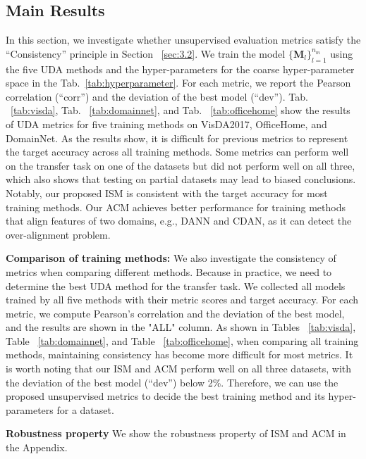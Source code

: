 \documentclass{article} %
\begin{document}
\subsection{Main Results}
\label{sec:4.2}

In this section, we investigate whether unsupervised evaluation metrics satisfy the ``Consistency'' principle in Section ~\ref{sec:3.2}. We train the model $\{\boldsymbol{M}_l\}_{l=1}^{n_m}$ using the five UDA methods and the hyper-parameters for the coarse hyper-parameter space in the Tab.~\ref{tab:hyperparameter}. For each metric, we report the Pearson correlation (``corr'') and the deviation of the best model (``dev'').
Tab. ~\ref{tab:visda}, Tab. ~\ref{tab:domainnet}, and Tab. ~\ref{tab:officehome} show the results of UDA metrics for five training methods on VisDA2017, OfficeHome, and DomainNet. As the results show, it is difficult for previous metrics to represent the target accuracy across all training methods. Some metrics can perform well on the transfer task on one of the datasets but did not perform well on all three, which also shows that testing on partial datasets may lead to biased conclusions. 
Notably, our proposed ISM is consistent with the target accuracy for most training methods. Our ACM achieves better performance for training methods that align features of two domains, e.g., DANN and CDAN, as it can detect the over-alignment problem.

\textbf{Comparison of training methods:}
We also investigate the consistency of metrics when comparing different methods. Because in practice, we need to determine the best UDA method for the transfer task. We collected all models trained by all five methods with their metric scores and target accuracy. For each metric, we compute Pearson's correlation and the deviation of the best model, and the results are shown in the "ALL" column.
As shown in Tables ~\ref{tab:visda}, Table ~\ref{tab:domainnet}, and Table ~\ref{tab:officehome}, when comparing all training methods, maintaining consistency has become more difficult for most metrics. It is worth noting that our ISM and ACM perform well on all three datasets, with the deviation of the best model (``dev'') below 2\%. Therefore, we can use the proposed unsupervised metrics to decide the best training method and its hyper-parameters for a dataset.

\textbf{Robustness property} We show the robustness property of ISM and ACM in the Appendix.
\end{document}
